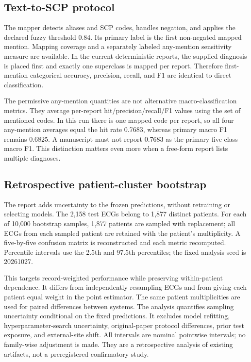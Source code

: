 \subsection{Text-to-SCP protocol}
The mapper detects aliases and SCP codes, handles negation, and applies the declared fuzzy threshold 0.84. Its primary label is the first non-negated mapped mention. Mapping coverage and a separately labeled any-mention sensitivity measure are available. In the current deterministic reports, the supplied diagnosis is placed first and exactly one superclass is mapped per report. Therefore first-mention categorical accuracy, precision, recall, and F1 are identical to direct classification.

The permissive any-mention quantities are not alternative macro-classification metrics. They average per-report hit/precision/recall/F1 values using the set of mentioned codes. In this run there is one mapped code per report, so all four any-mention averages equal the hit rate 0.7683, whereas primary macro F1 remains 0.6825. A manuscript must not report 0.7683 as the primary five-class macro F1. This distinction matters even more when a free-form report lists multiple diagnoses.

\subsection{Retrospective patient-cluster bootstrap}
The report adds uncertainty to the frozen predictions, without retraining or selecting models. The 2,158 test ECGs belong to 1,877 distinct patients. For each of 10,000 bootstrap samples, 1,877 patients are sampled with replacement; all ECGs from each sampled patient are retained with the patient's multiplicity. A five-by-five confusion matrix is reconstructed and each metric recomputed. Percentile intervals use the 2.5th and 97.5th percentiles; the fixed analysis seed is 20261027.

This targets record-weighted performance while preserving within-patient dependence. It differs from independently resampling ECGs and from giving each patient equal weight in the point estimator. The same patient multiplicities are used for paired differences between systems. The analysis quantifies sampling uncertainty conditional on the fixed predictions. It excludes model refitting, hyperparameter-search uncertainty, original-paper protocol differences, prior test exposure, and external-site shift. All intervals are nominal pointwise intervals; no family-wise adjustment is made. They are a retrospective analysis of existing artifacts, not a preregistered confirmatory study.

